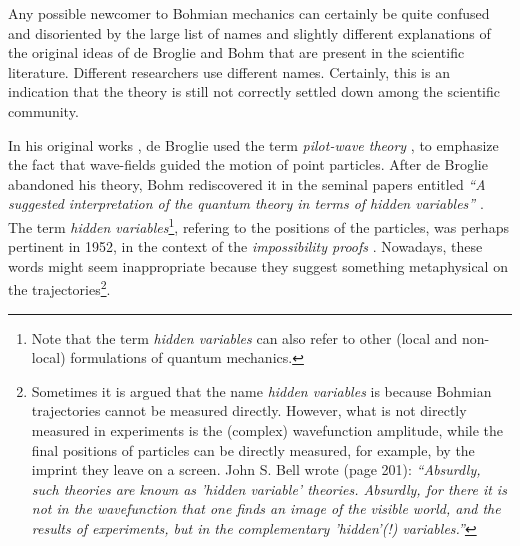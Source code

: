 \documentclass[nofootinbib, secnumarabic, amsmath, nobibnotes,10pt,aps,pra]{revtex4-1}
\begin{document}
Any possible newcomer to Bohmian mechanics can certainly be quite confused and disoriented by the large list of names and slightly different explanations of the original ideas of de Broglie and Bohm that are present in the scientific literature. Different researchers use different names. Certainly, this is an indication that the theory is still not correctly settled down among the scientific community.

In his original works \cite{om.dB_AnnPhys,om.debroglie1927b}, de Broglie used the term \emph{pilot-wave theory} \cite{om.Valentini2006}, to emphasize the fact that wave-fields guided the motion of point particles.
After de Broglie abandoned his theory, Bohm rediscovered it in the seminal papers entitled \emph{``A suggested interpretation of the quantum theory in terms of hidden variables''} \cite{om.bohm1952a,om.bohm1952b}.
The term \emph{hidden variables}\footnote{Note that the term \emph{hidden variables} can also refer to other (local and non-local) formulations of quantum mechanics.}, refering to the  positions of the particles, was perhaps pertinent in 1952, in the context of the \emph{impossibility proofs} \cite{om.impossibility_proofs}.
Nowadays, these words might seem inappropriate because they suggest something metaphysical on the trajectories\footnote{Sometimes it is argued that the name \emph{hidden variables} is because Bohmian trajectories cannot be measured directly. However, what is not directly measured in experiments is the (complex) wavefunction amplitude, while the final positions of particles can be directly measured, for example, by the imprint they leave on a screen. John S. Bell wrote \cite{om.Bell1987} (page 201): \emph{``Absurdly, such theories are known as 'hidden variable' theories. Absurdly, for there it is not in the wavefunction that one finds an image of the visible world, and the results of experiments, but in the complementary 'hidden'(!) variables.''}}.
\end{document}
